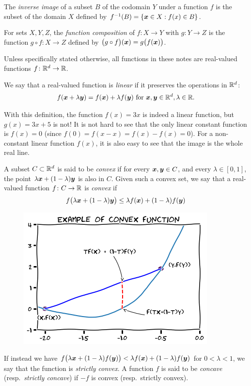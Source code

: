 The \emph{inverse image} of a subset $B$ of the codomain $Y$ under a function $f$ is the subset of the domain $X$ defined by $f^{-1}(B) = \{ \boldsymbol{x} \in X : f(x) \in B\}$.

For sets $X, Y, Z$, the \emph{function composition} of $f\colon X \to Y$ with $g\colon Y \to Z$ is the function $g\circ f\colon X \to Z$ defined by $\big( g \circ f \big)(\boldsymbol{x}) = g \big( f(\boldsymbol{x}) \big)$.

Unless specifically stated otherwise, all functions in these notes are real-valued functions $f \colon \mathbb{R}^d \to \mathbb{R}$.

\begin{example}\label{example:linearFunction}
We say that a real-valued function is \emph{linear} if it preserves the operations in $\mathbb{R}^d$: 
\begin{equation*}
f(\boldsymbol{x} + \lambda \boldsymbol{y}) = f(\boldsymbol{x}) + \lambda f(\boldsymbol{y}) \text{ for }\boldsymbol{x}, \boldsymbol{y} \in \mathbb{R}^d, \lambda \in \mathbb{R}.
\end{equation*}

With this definition, the function $f(x) = 3x$ is indeed a linear function, but $g(x)=3x+5$ is not!  
It is not hard to see that the only linear constant function is $f(x) = 0$ (since $f(0)=f(x-x)=f(x)-f(x)=0$).  For a non-constant linear function $f(x)$, it is also easy to see that the image is the whole real line.
\end{example}

\begin{example}\label{example:convexFunction}
A subset $C \subset \mathbb{R}^d$ is said to be \emph{convex} if for every $\boldsymbol{x}, \boldsymbol{y} \in C$, and every $\lambda \in [0,1]$, the point $\lambda \boldsymbol{x} + (1-\lambda) \boldsymbol{y}$ is also in $C$.   Given such a convex set, we say that a real-valued function $f \colon C \to \mathbb{R}$ is \emph{convex} if 
\begin{equation*}
f\big(\lambda \boldsymbol{x} + (1-\lambda)\boldsymbol{y}\big) \leq \lambda f(\boldsymbol{x}) + (1-\lambda) f(\boldsymbol{y})
\end{equation*}
\begin{figure}[ht!]\label{figure:convexFunction}
\includegraphics[width=0.5\linewidth]{convexFunction.png}
\end{figure}
If instead we have $f\big(\lambda \boldsymbol{x} + (1-\lambda)f(\boldsymbol{y})\big) < \lambda f(\boldsymbol{x}) + (1-\lambda) f(\boldsymbol{y})$ for $0<\lambda<1$, we say that the function is \emph{strictly convex}.  A function $f$ is said to be \emph{concave} (resp.~\emph{strictly concave}) if $-f$ is convex (resp.~strictly convex).
\end{example}

